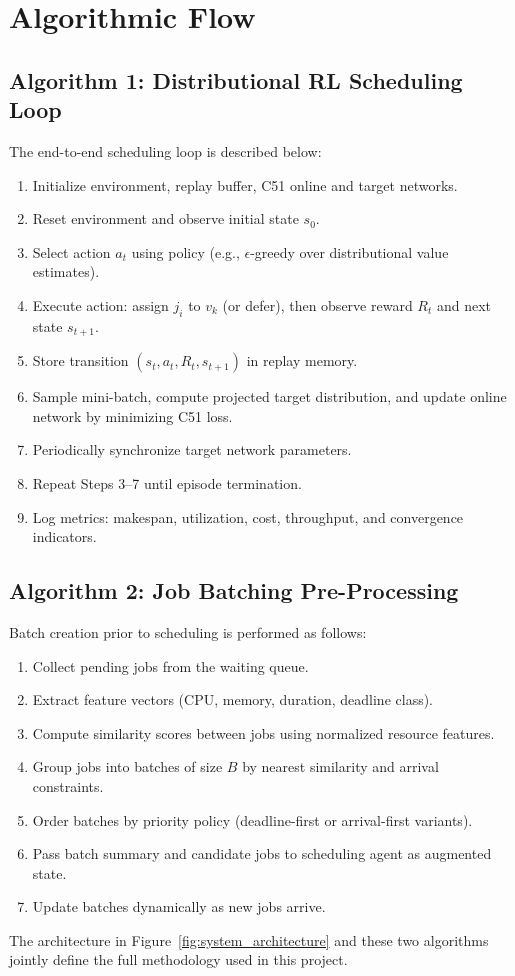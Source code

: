 \section{Algorithmic Flow}
\subsection{Algorithm 1: Distributional RL Scheduling Loop}
The end-to-end scheduling loop is described below:
\begin{enumerate}
    \item Initialize environment, replay buffer, C51 online and target networks.
    \item Reset environment and observe initial state $s_0$.
    \item Select action $a_t$ using policy (e.g., $\epsilon$-greedy over distributional value estimates).
    \item Execute action: assign $j_i$ to $v_k$ (or defer), then observe reward $R_t$ and next state $s_{t+1}$.
    \item Store transition $(s_t,a_t,R_t,s_{t+1})$ in replay memory.
    \item Sample mini-batch, compute projected target distribution, and update online network by minimizing C51 loss.
    \item Periodically synchronize target network parameters.
    \item Repeat Steps 3--7 until episode termination.
    \item Log metrics: makespan, utilization, cost, throughput, and convergence indicators.
\end{enumerate}

\subsection{Algorithm 2: Job Batching Pre-Processing}
Batch creation prior to scheduling is performed as follows:
\begin{enumerate}
    \item Collect pending jobs from the waiting queue.
    \item Extract feature vectors (CPU, memory, duration, deadline class).
    \item Compute similarity scores between jobs using normalized resource features.
    \item Group jobs into batches of size $B$ by nearest similarity and arrival constraints.
    \item Order batches by priority policy (deadline-first or arrival-first variants).
    \item Pass batch summary and candidate jobs to scheduling agent as augmented state.
    \item Update batches dynamically as new jobs arrive.
\end{enumerate}

The architecture in Figure~\ref{fig:system_architecture} and these two algorithms jointly define the full methodology used in this project.

